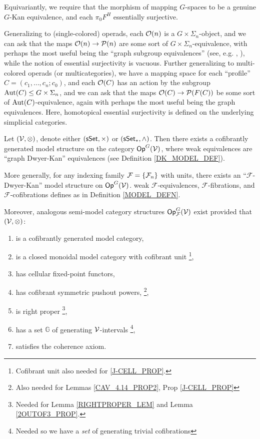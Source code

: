 \documentclass[a4paper,10pt
,draft
]{article}%
\renewcommand{\F}{\mathcal F}
\renewcommand{\1}{\eta}%
\begin{document}
Equivariantly, we require that the morphism of mapping $G$-spaces to be a genuine $G$-Kan equivalence, and
each $\pi_0F^H$ essentially surjective.

Generalizing to (single-colored) operads,
each $\mathcal{O}(n)$ is a $G \times \Sigma_n$-object, and we can ask that the maps $\mathcal{O}(n) \to \mathcal{P}(n)$ are some sort of $G \times \Sigma_n$-equivalence,
with perhaps the most useful being the ``graph subgroup equivalences'' (see, e.g. \cite{BP_geo}, \cite{BH15}),
while the notion of essential surjectivity is vacuous.
Further generalizing to multi-colored operads (or multicategories),
we have a mapping space for each ``profile'' $C = (c_1, \dots, c_n; c_0)$,
and each $\mathcal{O}(C)$ has an action by the subgroup $\operatorname{Aut}(C) \leq G \times \Sigma_n$,
and we can ask that the maps $\mathcal{O}(C) \to \mathcal{P}(F(C))$ be some sort of $\operatorname{Aut}(C)$-equivalence,
again with perhaps the most useful being the graph equivalences.
Here, homotopical essential surjectivity is defined on the underlying simplicial categories.

\begin{theorem}
      \label{INTRO_MODEL_THM}
      Let $(\mathcal V, \otimes)$, denote either $(\mathsf{sSet}, \times)$ or $(\sSet_{\**}, \wedge)$.
      Then there exists a cofibrantly generated model structure on the category $\mathsf{Op}^G(\mathcal V)$,
      where weak equivalences are ``graph Dwyer-Kan'' equivalences (see Definition \ref{DK_MODEL_DEF}). 

      More generally, for any indexing family $\F = \set{\F_n}$ with units,
      there exists an ``$\F$-Dwyer-Kan'' model structure on $\mathsf{Op}^G(\mathcal V)$.
      weak $\F$-equivalences, $\F$-fibrations, and $\F$-cofibrations defines as in Definition \ref{MODEL_DEFN}.
           
      Moreover, analogous semi-model category structures $\Op^G_\F(\V)$ exist
      provided that $(\mathcal V, \otimes)$:
      \begin{enumerate}[label = (\roman*)]\itemsep-4pt
      \item is a cofibrantly generated model category,
      \item is a closed monoidal model category with cofibrant unit
            \footnote{Cofibrant unit also needed for \ref{J-CELL_PROP}.},
      \item has cellular fixed-point functors,
      \item \label{I_CSPP_LBL} has cofibrant symmetric pushout powers,
            \footnote{Also needed for Lemmas \ref{CAV_4.14_PROP2}, Prop \ref{J-CELL_PROP}}, %
      \item \label{I_RP_LBL} is right proper
            \footnote{Needed for Lemma \ref{RIGHTPROPER_LEM} and Lemma \ref{2OUTOF3_PROP}.},
      \item \label{I_GENSET_LBL} has a set $\mathbb{G}$ of generating $\mathcal V$-intervals
            \footnote{Needed so we have a \textit{set} of generating trivial cofibrations},
      \item satisfies the coherence axiom.
      \end{enumerate}
\end{theorem}
\end{document}
